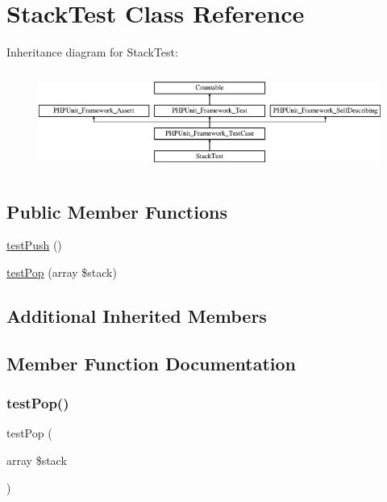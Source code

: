 \hypertarget{class_stack_test}{}\section{Stack\+Test Class Reference}
\label{class_stack_test}
Inheritance diagram for Stack\+Test\+:\begin{figure}[H]
\begin{center}
\leavevmode
\includegraphics[height=3.303835cm]{class_stack_test}
\end{center}
\end{figure}
\subsection*{Public Member Functions}
\begin{DoxyCompactItemize}
\item 
\mbox{\hyperlink{class_stack_test_a3c0a5103a2837b7c310175aacb9fd4d9}{test\+Push}} ()
\item 
\mbox{\hyperlink{class_stack_test_a4248feb8974212d5175d27bdad415dda}{test\+Pop}} (array \$stack)
\end{DoxyCompactItemize}
\subsection*{Additional Inherited Members}


\subsection{Member Function Documentation}
\mbox{\label{class_stack_test_a4248feb8974212d5175d27bdad415dda}} 
\subsubsection{\texorpdfstring{test\+Pop()}{testPop()}}
{\footnotesize\ttfamily test\+Pop (\begin{DoxyParamCaption}\item[{array}]{\$stack }\end{DoxyParamCaption})}

